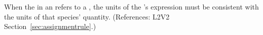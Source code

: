 When the  in an \InitialAssignment refers to a \Species,
the units of the \InitialAssignment's  expression must be
consistent with the units of that species' quantity.  (References: L2V2
Section~\ref{sec:assignmentrule}.)
